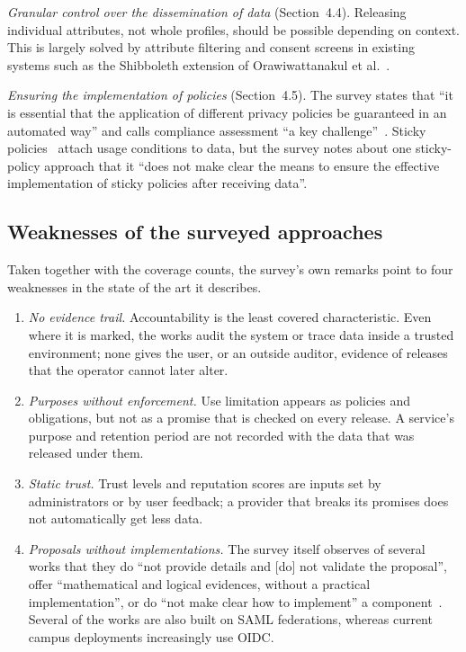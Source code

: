 \emph{Granular control over the dissemination of data} (Section~4.4). Releasing individual attributes, not whole profiles, should be possible depending on context. This is largely solved by attribute filtering and consent screens in existing systems such as the Shibboleth extension of Orawiwattanakul et al.~\cite{orawiwattanakul2010user}.

\emph{Ensuring the implementation of policies} (Section~4.5). The survey states that ``it is essential that the application of different privacy policies be guaranteed in an automated way'' and calls compliance assessment ``a key challenge''~\cite{werner2017survey}. Sticky policies~\cite{pearson2011sticky,chadwick2012privacy} attach usage conditions to data, but the survey notes about one sticky-policy approach that it ``does not make clear the means to ensure the effective implementation of sticky policies after receiving data''.

\subsection{Weaknesses of the surveyed approaches}
Taken together with the coverage counts, the survey's own remarks point to four weaknesses in the state of the art it describes.

\begin{enumerate}
\item \emph{No evidence trail.} Accountability is the least covered characteristic. Even where it is marked, the works audit the system or trace data inside a trusted environment; none gives the user, or an outside auditor, evidence of releases that the operator cannot later alter.
\item \emph{Purposes without enforcement.} Use limitation appears as policies and obligations, but not as a promise that is checked on every release. A service's purpose and retention period are not recorded with the data that was released under them.
\item \emph{Static trust.} Trust levels and reputation scores are inputs set by administrators or by user feedback; a provider that breaks its promises does not automatically get less data.
\item \emph{Proposals without implementations.} The survey itself observes of several works that they do ``not provide details and [do] not validate the proposal'', offer ``mathematical and logical evidences, without a practical implementation'', or do ``not make clear how to implement'' a component~\cite{werner2017survey}. Several of the works are also built on SAML federations, whereas current campus deployments increasingly use OIDC.
\end{enumerate}

